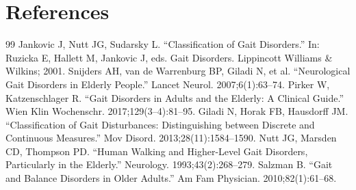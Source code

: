 \section*{References}
\begin{thebibliography}{99}
 Jankovic J, Nutt JG, Sudarsky L. ``Classification of Gait Disorders.'' In: Ruzicka E, Hallett M, Jankovic J, eds. Gait Disorders. Lippincott Williams \& Wilkins; 2001.
 Snijders AH, van de Warrenburg BP, Giladi N, et al. ``Neurological Gait Disorders in Elderly People.'' Lancet Neurol. 2007;6(1):63--74.
 Pirker W, Katzenschlager R. ``Gait Disorders in Adults and the Elderly: A Clinical Guide.'' Wien Klin Wochenschr. 2017;129(3--4):81--95.
 Giladi N, Horak FB, Hausdorff JM. ``Classification of Gait Disturbances: Distinguishing between Discrete and Continuous Measures.'' Mov Disord. 2013;28(11):1584--1590.
 Nutt JG, Marsden CD, Thompson PD. ``Human Walking and Higher-Level Gait Disorders, Particularly in the Elderly.'' Neurology. 1993;43(2):268--279.
 Salzman B. ``Gait and Balance Disorders in Older Adults.'' Am Fam Physician. 2010;82(1):61--68.
\end{thebibliography}
